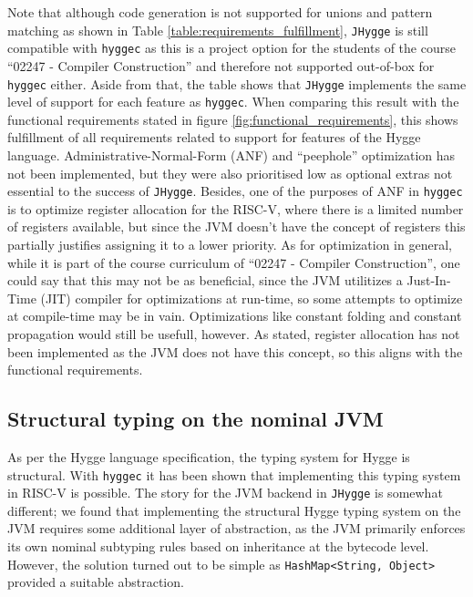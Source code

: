 Note that although code generation is not supported for unions and pattern matching as shown in Table \ref{table:requirements_fulfillment}, \texttt{JHygge} is still compatible with \texttt{hyggec}
as this is a project option for the students of the course ``02247 - Compiler Construction'' and therefore not supported out-of-box for \texttt{hyggec}
either. Aside from that, the table shows that \texttt{JHygge} implements the same level of support for each feature as \texttt{hyggec}.
When comparing this result with the functional requirements stated in figure \ref{fig:functional_requirements}, this shows fulfillment of all requirements related to support for features of the Hygge language. Administrative-Normal-Form (ANF) and
``peephole'' optimization has not been implemented, but they were also prioritised low as optional extras not essential to the success of \texttt{JHygge}.
Besides, one of the purposes of ANF in \texttt{hyggec} is to optimize register allocation for the RISC-V, where there is a limited number of registers
available, but since the JVM doesn't have the concept of registers this partially justifies assigning it to a lower priority. As for optimization
in general, while it is part of the course curriculum of ``02247 - Compiler Construction'', one could say that this may not be as beneficial,
since the JVM utilitizes a Just-In-Time (JIT) compiler for optimizations at run-time, so some attempts to optimize at compile-time may be in vain.
Optimizations like constant folding and constant propagation would still be usefull, however. As stated, register allocation has not been
implemented as the JVM does not have this concept, so this aligns with the functional requirements.

\subsection{Structural typing on the nominal JVM}

As per the Hygge language specification, the typing system for Hygge is structural. With \texttt{hyggec} it has been shown
that implementing this typing system in RISC-V is possible. The story for the JVM backend in \texttt{JHygge} is somewhat different;
we found that implementing the structural Hygge typing system on the JVM requires some additional layer of abstraction, as
the JVM primarily enforces its own nominal subtyping rules based on inheritance at the bytecode level.
However, the solution turned out to be simple as \texttt{HashMap<String, Object>} provided a suitable abstraction.

